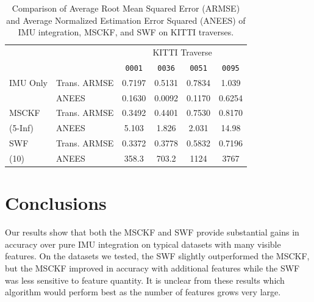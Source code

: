 \documentclass[letterpaper, 10 pt, conference]{ieeeconf}  %
\newcommand\T{\rule{0pt}{2.6ex}}        %
\newcommand\B{\rule[-1.2ex]{0pt}{0pt}} %
\begin{document}
\begin{table}
    \centering
    \caption{Comparison of Average Root Mean Squared Error (ARMSE) and Average Normalized Estimation Error Squared (ANEES) of IMU integration, MSCKF, and SWF on KITTI traverses.}
    \begin{tabular}{llcccc} 
                    &                   & \multicolumn{4}{c}{KITTI Traverse} \B      \\ \cline{3-6}
                    &                   & \texttt{0001} & \texttt{0036} & \texttt{0051} & \texttt{0095}    \T\B    \\ \hline
        IMU Only    & Trans. ARMSE      & 0.7197    & 0.5131    & 0.7834    & 1.039     \T      \\
                    & ANEES             & 0.1630    & 0.0092    & 0.1170    & 0.6254         \B      \\ \hline
        MSCKF       & Trans. ARMSE      & 0.3492    & 0.4401    & 0.7530    & 0.8170  \T      \\
        (5-Inf)     & ANEES             & 5.103     & 1.826     & 2.031     & 14.98          \B      \\ \hline
        SWF         & Trans. ARMSE      & 0.3372    & 0.3778    & 0.5832    & 0.7196  \T      \\
        (10)        & ANEES             & 358.3     & 703.2     & 1124      & 3767    \B      \\ \hline
    \end{tabular}
    \label{tab:kitti_results}
\end{table}


\section{Conclusions} \label{sec:conclusions}
Our results show that both the MSCKF and SWF provide substantial gains in accuracy over pure IMU integration on typical datasets with many visible features.
On the datasets we tested, the SWF slightly outperformed the MSCKF, but the MSCKF improved in accuracy with additional features while the SWF was less sensitive to feature quantity.
It is unclear from these results which algorithm would perform best as the number of features grows very large.
\end{document}

